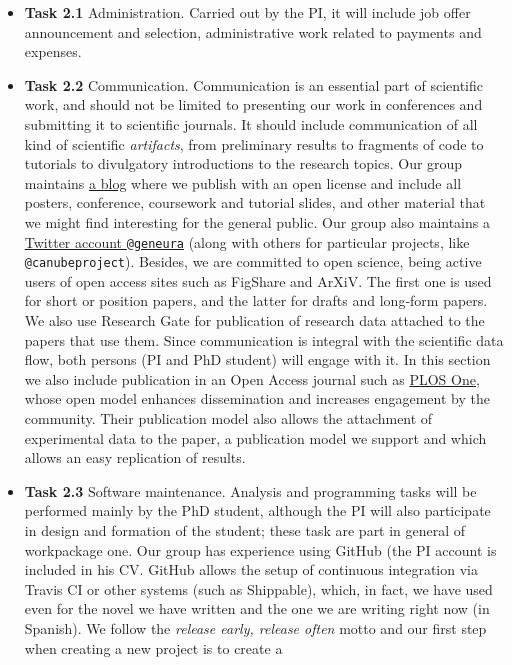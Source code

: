 \documentclass[a4paper,12pt,twocolumn]{article}
\begin{document}
\begin{itemize}
\item {\bf Task 2.1}  Administration. Carried out by the PI, it will
  include job offer announcement and selection, administrative work
  related to payments and expenses.
\item {\bf Task 2.2} Communication. Communication is an essential part
  of scientific work, and should not be limited to presenting our work
  in conferences and submitting it to scientific journals. It should
  include communication of all kind of scientific {\em artifacts},
  from preliminary results to fragments of code to tutorials to
  divulgatory introductions to the research topics. Our group
  maintains \href{http://geneura.wordpress.com}{a blog} where we
  publish with an open license and include all posters, conference,
  coursework and tutorial slides, and other material that we might
  find interesting for the general public. Our group also maintains a
  \href{http://twitter.com}{Twitter account {\tt @geneura}} (along
  with others for particular projects, like {\tt @canubeproject}). Besides, we are committed
  to open science, being active users of open access sites such as
  FigShare and ArXiV. 
The first one is used for short or position
  papers, and the latter for drafts and long-form papers. We also use
  Research Gate for publication of research data attached to the
  papers that use them. Since communication is integral with the
  scientific data flow, both persons (PI and PhD student) will engage
  with it. In this section we also include publication in an Open
  Access journal such as \href{http://plosone.org}{PLOS One}, whose
  open model enhances dissemination and increases engagement by the
  community. Their publication model also allows the attachment of
  experimental data to the paper, a publication model we support and
  which allows an easy replication of results. 
\item{\bf Task 2.3} Software maintenance. Analysis and programming
  tasks will be performed mainly by the PhD student, although the PI
  will also participate in design and formation of the student; these
  task are part in general of workpackage one. Our
  group has experience using GitHub (the PI account is included in his
  CV. GitHub allows the setup of continuous integration via Travis CI
  or other systems (such as Shippable), which, in fact, we have used
  even for the novel we have written and the one we are writing right
  now (in Spanish). We follow the {\em release early, release often}
  motto and our first step when creating a new project is to create a

\end{itemize}
\end{document}
